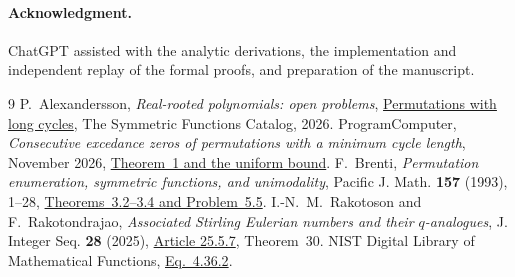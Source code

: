 \documentclass[11pt]{article}
\begin{document}
\paragraph{Acknowledgment.}
ChatGPT assisted with the analytic derivations, the implementation and independent replay of the formal proofs, and preparation of the manuscript.
\begin{thebibliography}{9}
P.~Alexandersson, \emph{Real-rooted polynomials: open problems},
\href{https://www.symmetricfunctions.com/realRootedOpenProblems.htm\#permutations-with-long-cycles}{Permutations with long cycles},
The Symmetric Functions Catalog, 2026.
ProgramComputer, \emph{Consecutive excedance zeros of permutations with a minimum cycle length}, November 2026,
\href{https://github.com/ProgramComputer/open-math-research/blob/4da48b72ed8f92f96c2faf60e2d63d253b3b507a/topics/long-cycle-excedances/paper.tex}{Theorem~1 and the uniform bound}.
F.~Brenti, \emph{Permutation enumeration, symmetric functions, and
unimodality}, Pacific J. Math. \textbf{157} (1993), 1--28,
\href{https://msp.org/pjm/1993/157-1/pjm-v157-n1-p01-s.pdf}{Theorems~3.2--3.4 and Problem~5.5}.
I.-N.~M.~Rakotoson and F.~Rakotondrajao,
\emph{Associated Stirling Eulerian numbers and their \(q\)-analogues},
J. Integer Seq. \textbf{28} (2025),
\href{https://cs.uwaterloo.ca/journals/JIS/VOL28/Rakotoson/rakoto12.html}{Article 25.5.7},
Theorem~30.
NIST Digital Library of Mathematical Functions,
\href{https://dlmf.nist.gov/4.36.E2}{Eq.~4.36.2}.
\end{thebibliography}
\end{document}
